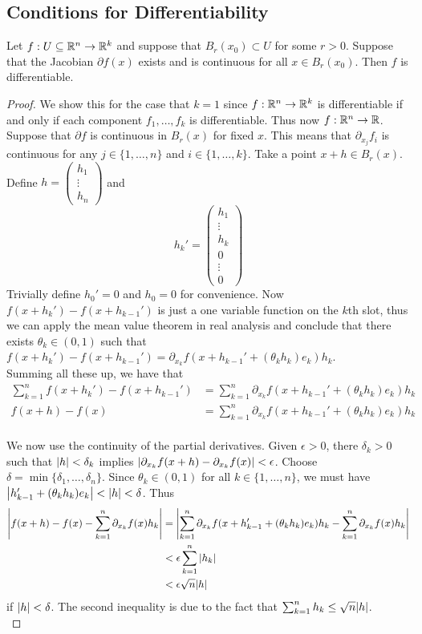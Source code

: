 \documentclass[a4paper]{article}
\begin{document}
\subsection{Conditions for Differentiability}
\begin{thm}{}{} Let $f:U\subseteq\mathbb{R}^n\to\mathbb{R}^k$ and suppose that $B_r(x_0)\subset U$ for some $r>0$. Suppose that the Jacobian $\partial f(x)$ exists and is continuous for all $x\in B_r(x_0)$. Then $f$ is differentiable. 
\begin{proof}
We show this for the case that $k=1$ since $f:\mathbb{R}^n\to\mathbb{R}^k$ is differentiable if and only if each component $f_1,\dots,f_k$ is differentiable. Thus now $f:\mathbb{R}^n\to\mathbb{R}$. Suppose that $\partial f$ is continuous in $B_r(x)$ for fixed $x$. This means that $\partial_{x_j}f_i$ is continuous for any $j\in\{1,\dots,n\}$ and $i\in\{1,\dots,k\}$. Take a point $x+h\in B_r(x)$. Define $h=\begin{pmatrix}
h_1\\ \vdots\\ h_n
\end{pmatrix}$ and $$h_k'=\begin{pmatrix}h_1\\\vdots\\ h_k\\0\\\vdots\\0\end{pmatrix}$$ Trivially define $h_0'=0$ and $h_0=0$ for convenience. Now $f(x+h_k')-f(x+h_{k-1}')$ is just a one variable function on the $k$th slot, thus we can apply the mean value theorem in real analysis and conclude that there exists $\theta_{k}\in(0,1)$ such that $f(x+h_k')-f(x+h_{k-1}')=\partial_{x_k}f(x+h_{k-1}'+(\theta_kh_k)e_k)h_k$. \\
Summing all these up, we have that 
\begin{align*}
\sum_{k=1}^nf(x+h_k')-f(x+h_{k-1}')&=\sum_{k=1}^n\partial_{x_k}f(x+h_{k-1}'+(\theta_kh_k)e_k)h_k\\
f(x+h)-f(x)&=\sum_{k=1}^n\partial_{x_k}f(x+h_{k-1}'+(\theta_kh_k)e_k)h_k
\end{align*}~\\

We now use the continuity of the partial derivatives. Given $\epsilon>0$, there $\delta_k>0$ such that $\abs{h}<\delta_k$ implies $\abs{\partial_{x_k}f(x+h)-\partial_{x_k}f(x)}<\epsilon$. Choose $\delta=\min\{\delta_1,\dots,\delta_n\}$. Since $\theta_k\in(0,1)$ for all $k\in\{1,\dots,n\}$, we must have $\abs{h_{k-1}'+(\theta_kh_k)e_k}<\abs{h}<\delta$. Thus
\begin{align*}
\abs{f(x+h)-f(x)-\sum_{k=1}^n\partial_{x_k}f(x)h_k}&=\abs{\sum_{k=1}^n\partial_{x_k}f(x+h_{k-1}'+(\theta_kh_k)e_k)h_k-\sum_{k=1}^n\partial_{x_k}f(x)h_k}\\
&<\epsilon\sum_{k=1}^n\abs{h_k}\\
&<\epsilon\sqrt{n}\abs{h}
\end{align*}
if $\abs{h}<\delta$. The second inequality is due to the fact that $\sum_{k=1}^nh_k\leq\sqrt{n}\abs{h}$. \\


\end{proof}
\end{thm}
\end{document}
